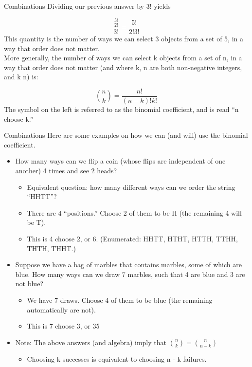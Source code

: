 \documentclass[aspectratio=169]{../latex_main/tntbeamer}  %
\begin{document}
	
	\begin{frame}{Combinations}
	    Dividing our previous answer by 3! yields


        \begin{equation*}
            \frac{\frac{5!}{2!}}{3!} = \frac{5!}{2!3!}
        \end{equation*}
        This quantity is the number of ways we can select 3 objects from a set of 5, in a way that order does not matter.\\
        
        More generally, the number of ways we can select k objects from a set of n, in a way that order does not matter (and where k, n are both non-negative integers, and k \leq n) is:

        \begin{equation*}
            \binom{n}{k}= \frac{n!}{(n-k)!k!}
        \end{equation*}
        The symbol on the left is referred to as the binomial coefficient, and is read “n choose k.”

	\end{frame}
	
	
	\begin{frame}{Combinations}
	    Here are some examples on how we can (and will) use the binomial coefficient.
        \begin{itemize}
            \item How many ways can we flip a coin (whose flips are independent of one another) 4 times and see 2 heads?
            \begin{itemize}
                \item Equivalent question: how many different ways can we order the string “HHTT”?
                \item There are 4 “positions.” Choose 2 of them to be H (the remaining 4 will be T).
                \item This is 4 choose 2, or 6. (Enumerated: HHTT, HTHT, HTTH, TTHH, THTH, THHT.)
            \end{itemize}
            \item Suppose we have a bag of marbles that contains marbles, some of which are blue. How many ways can we draw 7 marbles, such that 4 are blue and 3 are not blue?
            \begin{itemize}
                \item We have 7 draws. Choose 4 of them to be blue (the remaining automatically are not).
                \item This is 7 choose 3, or 35 
            \end{itemize}
            \item Note: The above answers (and algebra) imply that $\binom{n}{k}=\binom{n}{n-k}$
            \begin{itemize}
                \item Choosing k successes is equivalent to choosing n - k failures.
            \end{itemize}
        \end{itemize}

	\end{frame}
	
\end{document}
